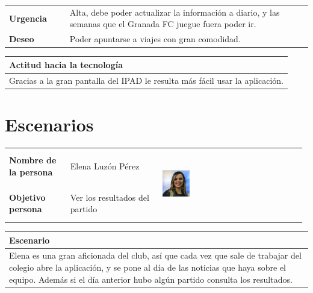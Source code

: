 \documentclass[11pt]{article}
\begin{document}
\begin{table}[H]
  \begin{tabular}{p{0.2\linewidth}|p{0.8\linewidth}}
    \toprule
    \textbf{Urgencia} & Alta, debe poder actualizar la información a diario, y las semanas que el Granada FC juegue fuera poder ir.\\
    \textbf{Deseo}  & Poder apuntarse a viajes con gran comodidad.\\
    \bottomrule
  \end{tabular}

  \begin{tabular}{p{1.028\linewidth}}
    \textbf{Actitud hacia la tecnología}\\
    \midrule
    Gracias a la gran pantalla del IPAD le resulta más fácil usar la aplicación.
  \end{tabular}
\end{table}

\section{Escenarios}
\begin{table}[H]
  \centering
  \begin{tabular}{p{0.2\linewidth}|p{0.3\linewidth}p{0.475\linewidth}}
    \toprule
    \textbf{Nombre de la persona} & Elena Luzón Pérez &\multirow{2}{*}{\begin{minipage}{1.\textwidth}\includegraphics[width=0.2\textwidth, height=30mm]{Elena}\end{minipage}}\\
    \textbf{Objetivo persona} & Ver los resultados del partido & \\
    \bottomrule
  \end{tabular}

\begin{tabular}{p{1.028\linewidth}}
  \textbf{Escenario}\\
  \midrule
  Elena es una gran aficionada del club, así que cada vez que sale de trabajar del colegio abre la aplicación, y se pone al día de las noticias que haya sobre el equipo. Además si el día anterior hubo algún partido consulta los resultados.
\end{tabular}
\end{table}
\end{document}
